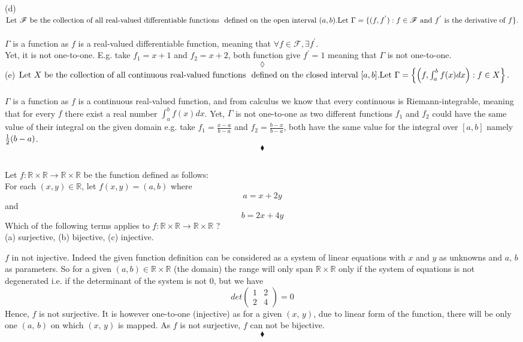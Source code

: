 (d) $\text{Let } \mathscr{F}\text{ be the collection of all real-valued differentiable functions }\\ 
\text{ defined on the open interval } (a,b). 
\text{Let }\Gamma=\{(f,f^{'}):f\in\mathscr{F} \text{ and } f^{'} \text{ is the derivative of } f\}.$ \\\\
$\Gamma$ is a function as $f$ is a real-valued differentiable function, meaning that $\forall f\in \mathscr{F}, \exists f^{'}$.\\
Yet, it is not one-to-one. E.g. take $f_1 = x+1$ and $f_2= x+2$, both function give $f^{'}= 1$ meaning that $\Gamma$ is not one-to-one.
$$\lozenge$$
(e) $\text{Let } X \text{ be the collection of all continuous real-valued functions }\\ 
\text{ defined on the closed interval } [a,b]. \\
\text{Let }\Gamma=\left\{\left ( f,\int_a^b f(x)dx\right):f\in X  \right \}.  $ \\\\
$\Gamma$ is a function as $f$ is a continuous real-valued function, and from calculus we know that every continuous is Riemann-integrable, meaning that for every $f$ there exist a real number $\int_a^b f(x)dx$. Yet,  $\Gamma$ is not one-to-one as two  
different functions $f_1$ and $f_2$ could have the same value of their integral on the given domain e.g. take $f_1= \frac{x-a}{b-a}$ and $f_2= \frac{b-x}{b-a}$, both have the same value for the integral over $[a,b]$ namely $\frac{1}{2}(b-a)$.
$$\blacklozenge$$

\subsection{}
\begin{tcolorbox}
Let $f:\mathbb{R}\times \mathbb{R}\rightarrow \mathbb{R}\times \mathbb{R}$ be the function defined as follows: \\
For each $(x,y) \in \mathbb{R}$, let $f(x,y) = (a,b)$ where
$$a= x+ 2y$$
and
$$b= 2x+4y$$
Which of the following terms applies to  $f:\mathbb{R}\times \mathbb{R}\rightarrow \mathbb{R}\times \mathbb{R}$ ?\\
(a) surjective, (b) bijective, (c) injective.
\end{tcolorbox}
$f$ in not injective. Indeed the given function definition can be considered as a system of linear equations with $x$ and $y$ as unknowns and $a,\, b$ as parameters. So for a given $(a,b)  \in \mathbb{R}\times \mathbb{R}$ (the domain) the range will only span $\mathbb{R}\times \mathbb{R}$ only if the system of equations is not degenerated i.e. if the determinant of the system is not $0$, but we have $$det\left(\begin{matrix}1&2\\2&4\end{matrix}\right) =0$$
Hence, $f$ is not surjective. It is however one-to-one (injective) as for a given $(x,\, y)$, due to linear form of the function, there will be only one $(a,\, b)$ on which $(x,\, y)$ is mapped. As $f$ is not surjective, $f$ can not be bijective.
$$\blacklozenge$$
\newpage
